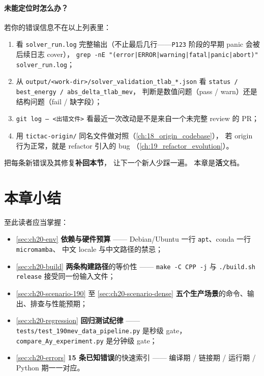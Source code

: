 \paragraph{未能定位时怎么办？}
若你的错误信息不在以上列表里：
\begin{enumerate}
  \item 看 \texttt{solver\_run.log} 完整输出（不止最后几行——\texttt{P123} 阶段的早期 panic
        会被后续日志 cover），
        \texttt{grep -nE "(error|ERROR|warning|fatal|panic|abort)" solver\_run.log}；
  \item 从 \texttt{output/<work-dir>/solver\_validation\_tlab\_*.json}
        看 \texttt{status / best\_energy / abs\_delta\_tlab\_mev}，
        判断是数值问题（pass / warn）还是结构问题（fail / 缺字段）；
  \item \texttt{git log -- <出错文件>} 看最近一次改动是不是来自一个未完整 review 的 PR；
  \item 用 \texttt{tictac-origin/} 同名文件做对照（\cref{ch:18_origin_codebase}），
        若 origin 行为正常，就是 refactor 引入的 bug
        （\cref{ch:19_refactor_evolution}）。
\end{enumerate}
把每条新错误及其修复\textbf{补回本节}，
让下一个新人少踩一遍。
本章是\textbf{活}文档。

\section*{本章小结}

至此读者应当掌握：
\begin{itemize}
  \item \cref{sec:ch20-env} \textbf{依赖与硬件预算} ——
        Debian/Ubuntu 一行 \texttt{apt}、conda 一行 \texttt{micromamba}、
        中文 locale 与中文路径的禁忌；
  \item \cref{sec:ch20-build} \textbf{两条构建路径}的等价性 ——
        \texttt{make -C CPP -j} 与 \texttt{./build.sh release} 接受同一份输入文件；
  \item \cref{sec:ch20-scenario-190} 至 \cref{sec:ch20-scenario-dense}
        \textbf{五个生产场景}的命令、输出、排查与性能预期；
  \item \cref{sec:ch20-regression} \textbf{回归测试纪律} ——
        \texttt{tests/test\_190mev\_data\_pipeline.py} 是秒级 gate，
        \texttt{compare\_Ay\_experiment.py} 是分钟级 gate；
  \item \cref{sec:ch20-errors} \textbf{15 条已知错误}的快速索引 ——
        编译期 / 链接期 / 运行期 / Python 期一一对应。
\end{itemize}

